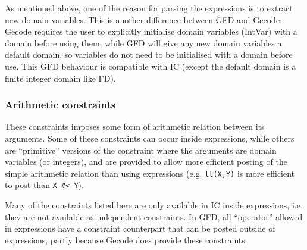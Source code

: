 As mentioned above, one of the reason for parsing the expressions is to
extract new domain variables. This is another difference between GFD and
Gecode: Gecode requires the user to explicitly initialise domain variables 
(IntVar) with a domain before using them, while GFD will give any new 
domain variables a default domain, so variables do not need to be 
initialised  with a domain before use. This GFD behaviour is compatible with
IC (except the default domain is a finite integer domain like FD).



\subsubsection{Arithmetic constraints}

These constraints imposes some form of arithmetic relation between its
arguments. Some of these constraints can occur inside expressions, while
others are ``primitive'' versions of the constraint where the arguments
are domain variables (or integers), and are provided to  allow more efficient
posting of the simple arithmetic relation than using expressions (e.g.
{\tt lt(X,Y)} is more efficient to post than {\tt X \#< Y}).

Many of the constraints listed here are only available in IC inside
expressions, i.e. they are not available as independent constraints.
In GFD, all ``operator'' allowed in expressions have a constraint
counterpart that can be posted outside of expressions, partly because
Gecode does provide these constraints.



